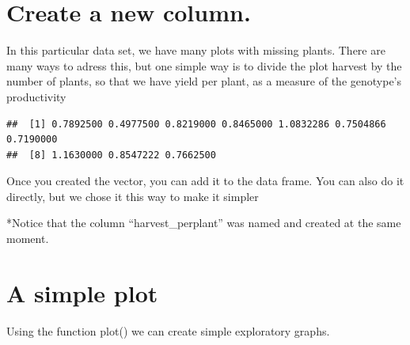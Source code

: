 \documentclass[
]{book}
\newenvironment{Shaded}{\begin{snugshade}}{\end{snugshade}}
\newcommand{\CommentTok}[1]{\textcolor[rgb]{0.56,0.35,0.01}{\textit{#1}}}
\newcommand{\DecValTok}[1]{\textcolor[rgb]{0.00,0.00,0.81}{#1}}
\newcommand{\NormalTok}[1]{#1}
\newcommand{\OtherTok}[1]{\textcolor[rgb]{0.56,0.35,0.01}{#1}}
\newcommand{\SpecialCharTok}[1]{\textcolor[rgb]{0.00,0.00,0.00}{#1}}
\begin{document}
\hypertarget{create-a-new-column.}{%
\section{Create a new column.}\label{create-a-new-column.}}

In this particular data set, we have many plots with missing plants. There are many ways to adress this, but one simple way is to divide the plot harvest by the number of plants, so that we have yield per plant, as a measure of the genotype's productivity

\begin{Shaded}
\end{Shaded}

\begin{verbatim}
##  [1] 0.7892500 0.4977500 0.8219000 0.8465000 1.0832286 0.7504866 0.7190000
##  [8] 1.1630000 0.8547222 0.7662500
\end{verbatim}

Once you created the vector, you can add it to the data frame. You can also do it directly, but we chose it this way to make it simpler

\begin{Shaded}
\end{Shaded}

*Notice that the column ``harvest\_perplant'' was named and created at the same moment.

\hypertarget{a-simple-plot}{%
\section{A simple plot}\label{a-simple-plot}}

Using the function plot() we can create simple exploratory graphs.
\end{document}
